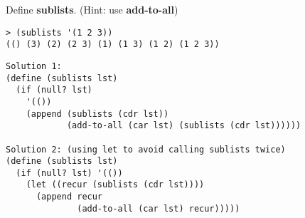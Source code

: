 \question
Define \textbf{sublists}. (Hint: use \textbf{add-to-all})

\begin{lstlisting}
> (sublists '(1 2 3))
(() (3) (2) (2 3) (1) (1 3) (1 2) (1 2 3))
\end{lstlisting}

\begin{solution}[0.5in]
\begin{verbatim}
Solution 1:
(define (sublists lst)
  (if (null? lst)
    '(())
    (append (sublists (cdr lst))
            (add-to-all (car lst) (sublists (cdr lst))))))

Solution 2: (using let to avoid calling sublists twice)
(define (sublists lst)
  (if (null? lst) '(())
    (let ((recur (sublists (cdr lst))))
      (append recur
              (add-to-all (car lst) recur)))))
\end{verbatim}
\end{solution}

